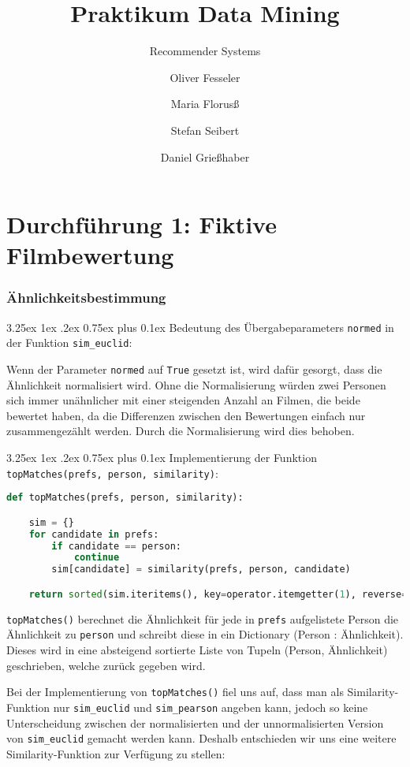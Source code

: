 \documentclass[12pt,a4paper]{scrartcl}
\makeatletter
\renewcommand\subparagraph{\@startsection{subparagraph}{5}{\parindent}%
    {3.25ex \@plus1ex \@minus .2ex}%
    {0.75ex plus 0.1ex}%
    {\normalfont\normalsize\bfseries}}
\makeatother
\begin{document}
\title{Praktikum Data Mining}
\subtitle{Recommender Systems}
\author{Oliver Fesseler \and Maria Florus\ss \and Stefan Seibert \and  Daniel Grie\ss haber}
\maketitle
\newpage

\part*{ Durchf\"uhrung 1: Fiktive Filmbewertung}

\section*{\"Ahnlichkeitsbestimmung}
\subparagraph{Bedeutung des \"Ubergabeparameters \lstinline{normed} in der Funktion \lstinline{sim_euclid}:}

Wenn der Parameter \lstinline{normed} auf \lstinline{True} gesetzt ist, wird daf\"ur gesorgt, dass die \"Ahnlichkeit normalisiert wird. 
Ohne die Normalisierung w\"urden zwei Personen sich immer un\"ahnlicher mit einer steigenden Anzahl an Filmen, die beide bewertet haben, da die Differenzen zwischen den Bewertungen einfach nur zusammengez\"ahlt werden. 
Durch die Normalisierung wird dies behoben. 

\subparagraph{Implementierung der Funktion \lstinline|topMatches(prefs, person, similarity)|:}

\begin{lstlisting}[language=Python]
def topMatches(prefs, person, similarity):

    sim = {}
    for candidate in prefs:
        if candidate == person:
            continue
        sim[candidate] = similarity(prefs, person, candidate)

    return sorted(sim.iteritems(), key=operator.itemgetter(1), reverse=True)
\end{lstlisting}

\lstinline{topMatches()} berechnet die \"Ahnlichkeit f\"ur jede in \lstinline{prefs} aufgelistete Person die \"Ahnlichkeit zu \lstinline{person} und schreibt diese in ein Dictionary (Person : \"Ahnlichkeit). Dieses wird in eine absteigend sortierte Liste von Tupeln (Person, \"Ahnlichkeit) geschrieben, welche zur\"uck gegeben wird.  

Bei der Implementierung von \lstinline{topMatches()} fiel uns auf, dass man als Similarity-Funktion nur \lstinline{sim_euclid} und \lstinline{sim_pearson} angeben kann, jedoch so keine Unterscheidung zwischen der normalisierten und der unnormalisierten Version von \lstinline{sim_euclid} gemacht werden kann.
Deshalb entschieden wir uns eine weitere Similarity-Funktion zur Verf\"ugung zu stellen: 
\end{document}
